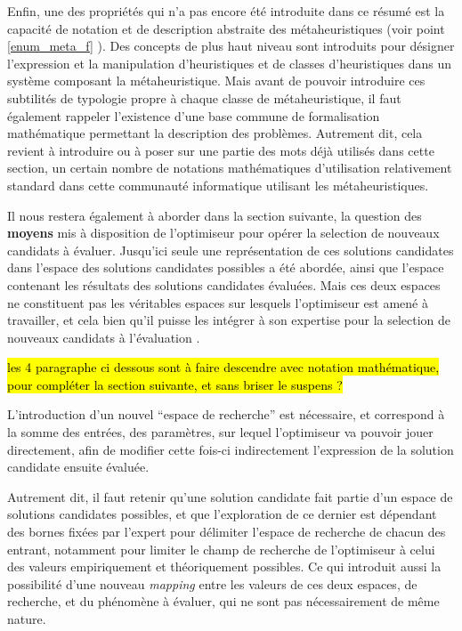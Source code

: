 Enfin, une des propriétés qui n'a pas encore été introduite dans ce résumé est la capacité de notation et de description abstraite des métaheuristiques (voir point \ref{enum_meta_f} ). Des concepts de plus haut niveau sont introduits pour désigner l'expression et la manipulation d'heuristiques et de classes d'heuristiques dans un système composant la métaheuristique. Mais avant de pouvoir introduire ces subtilités de typologie propre à chaque classe de métaheuristique, il faut également rappeler l'existence d'une base commune de formalisation mathématique permettant la description des problèmes. Autrement dit, cela revient à introduire ou à poser sur une partie des mots déjà utilisés dans cette section, un certain nombre de notations mathématiques d'utilisation relativement standard dans cette communauté informatique utilisant les métaheuristiques.

Il nous restera également à aborder dans la section suivante, la question des \textbf{moyens} mis à disposition de l'optimiseur pour opérer la selection de nouveaux candidats à évaluer. Jusqu'ici seule une représentation de ces solutions candidates dans l'espace des solutions candidates possibles a été abordée, ainsi que l'espace contenant les résultats des solutions candidates évaluées. Mais ces deux espaces ne constituent pas les véritables espaces sur lesquels l'optimiseur est amené à travailler, et cela bien qu'il puisse les intégrer à son expertise pour la selection de nouveaux candidats à l'évaluation . 

\hl{les 4 paragraphe ci dessous sont à faire descendre avec notation mathématique, pour compléter la section suivante, et sans briser le suspens ?}

L'introduction d'un nouvel \enquote{espace de recherche} est nécessaire, et  correspond à la somme des entrées, des paramètres, sur lequel l'optimiseur va pouvoir jouer directement, afin de modifier cette fois-ci indirectement l'expression de la solution candidate ensuite évaluée.

Autrement dit, il faut retenir qu'une solution candidate fait partie d'un espace de solutions candidates possibles, et que l'exploration de ce dernier est dépendant des bornes fixées par l'expert pour délimiter l'espace de recherche de chacun des entrant, notamment pour limiter le champ de recherche de l'optimiseur à celui des valeurs empiriquement et théoriquement possibles. Ce qui introduit aussi la possibilité d'une nouveau \textit{mapping} entre les valeurs de ces deux espaces, de recherche, et du phénomène à évaluer, qui ne sont pas nécessairement de même nature. 

